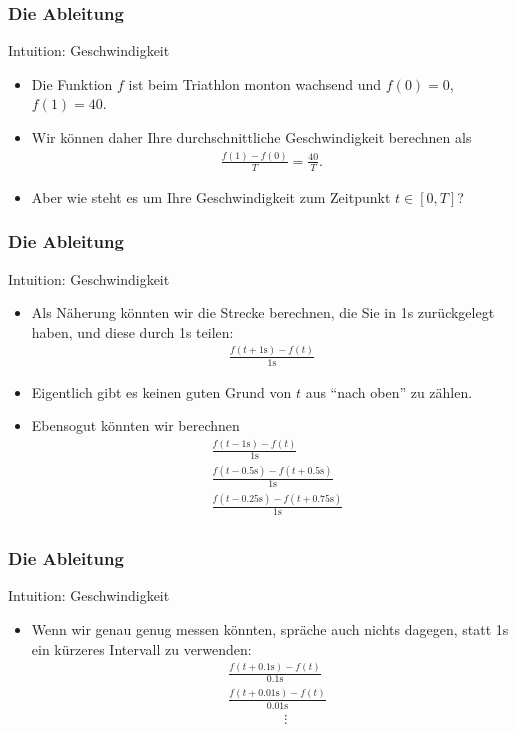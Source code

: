 \documentclass{beamer}
\renewcommand{\ae}{\"a}
\renewcommand{\oe}{\"o}
\newcommand{\ue}{\"u}
\newcommand{\mytitle}{Die Ableitung}
\begin{document}
\begin{frame}\frametitle{\mytitle}
	\begin{block}{Intuition: Geschwindigkeit}
		\begin{itemize}
			\item Die Funktion $f$ ist beim Triathlon monton wachsend und $f(0)=0$, $f(1)=40$.
			\item Wir k\oe nnen daher Ihre durchschnittliche Geschwindigkeit berechnen als
				\begin{align*}
					\frac{f(1)-f(0)}{T}=\frac{40}{T}.
				\end{align*}
			\item Aber wie steht es um Ihre Geschwindigkeit \alert{zum Zeitpunkt} $t\in[0,T]$?
		\end{itemize}
	\end{block}
\end{frame}

\begin{frame}\frametitle{\mytitle}
	\begin{block}{Intuition: Geschwindigkeit}
		\begin{itemize}
			\item Als N\ae herung k\oe nnten wir die Strecke berechnen, die Sie in 1s zur\ue ckgelegt haben, und diese durch 1s teilen:
				\begin{align*}
					\frac{f(t+1\mathrm s)-f(t)}{1\mathrm s}
				\end{align*}
			\item Eigentlich gibt es keinen guten Grund von $t$ aus ``nach oben'' zu z\ae hlen.
			\item Ebensogut k\oe nnten wir berechnen
				\begin{align*}
				&	\frac{f(t-1\mathrm s)-f(t)}{1\mathrm s}\\
				&	\frac{f(t-0.5\mathrm s)-f(t+0.5\mathrm s)}{1\mathrm s}\\
				&	\frac{f(t-0.25\mathrm s)-f(t+0.75\mathrm s)}{1\mathrm s}\\
				\end{align*}
		\end{itemize}
	\end{block}
\end{frame}

\begin{frame}\frametitle{\mytitle}
	\begin{block}{Intuition: Geschwindigkeit}
		\begin{itemize}
			\item Wenn wir genau genug messen k\oe nnten, spr\ae che auch nichts dagegen, statt 1s ein k\ue rzeres Intervall zu verwenden:
				\begin{align*}
					&\frac{f(t+0.1\mathrm s)-f(t)}{0.1\mathrm s}\\
					&\frac{f(t+0.01\mathrm s)-f(t)}{0.01\mathrm s}\\
					&\qquad\qquad\vdots
				\end{align*}
		\end{itemize}
	\end{block}
\end{frame}
\end{document}
